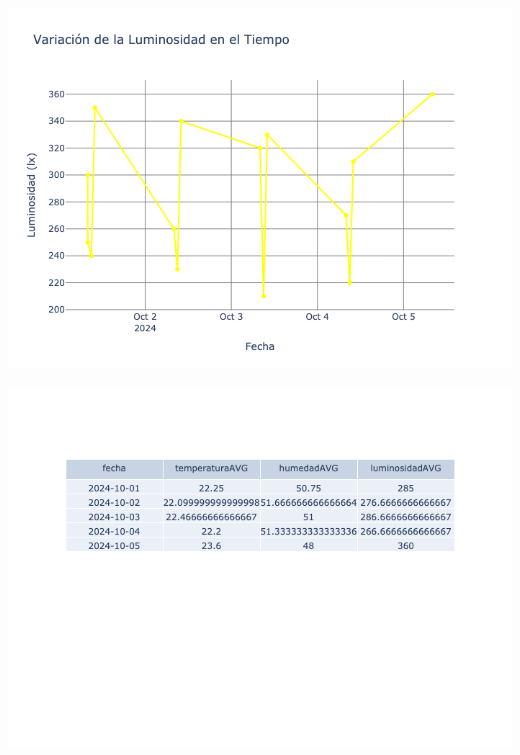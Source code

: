 \documentclass{article}
\begin{document}
    \noindent
    \begin{minipage}{0.48\textwidth}
        \centering
        \includegraphics[width=\textwidth]{../img/poli/LS101-90Dias-03-12-2024.png}
    \end{minipage}
    \hfill
    \begin{minipage}{0.48\textwidth}
        \centering
        \includegraphics[width=\textwidth]{../img/tables/CAVG101-90Dias-03-12-2024.png}
    \end{minipage}
    
\end{document}
